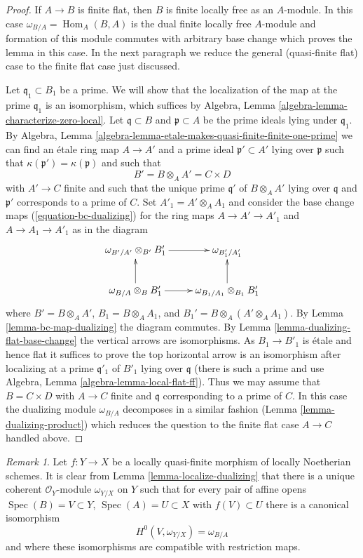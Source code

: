 \documentclass{stacks-project}
\theoremstyle{plain}
\theoremstyle{definition}
\theoremstyle{remark}
\newtheorem{remark}[subsection]{Remark}
\numberwithin{equation}{subsection}
\def\Spec{\mathop{\mathrm{Spec}}}
\def\Hom{\mathop{\mathrm{Hom}}\nolimits}
\begin{document}
\begin{proof}
If $A \to B$ is finite flat, then $B$ is finite locally free as an $A$-module.
In this case $\omega_{B/A} = \Hom_A(B, A)$ is the dual finite
locally free $A$-module and formation of this module commutes
with arbitrary base change which proves the lemma in this case.
In the next paragraph we reduce the general (quasi-finite flat)
case to the finite flat case just discussed.

\medskip\noindent
Let $\mathfrak q_1 \subset B_1$ be a prime. We will show that the
localization of the map at the prime $\mathfrak q_1$ is an isomorphism, which
suffices by Algebra, Lemma \ref{algebra-lemma-characterize-zero-local}.
Let $\mathfrak q \subset B$ and $\mathfrak p \subset A$ be the prime
ideals lying under $\mathfrak q_1$. By
Algebra, Lemma \ref{algebra-lemma-etale-makes-quasi-finite-finite-one-prime}
we can find an \'etale ring map $A \to A'$ and a prime
ideal $\mathfrak p' \subset A'$ lying over $\mathfrak p$
such that $\kappa(\mathfrak p') = \kappa(\mathfrak p)$ and
such that
$$
B' = B \otimes_A A' = C \times D
$$
with $A' \to C$ finite and such that the unique prime $\mathfrak q'$
of $B \otimes_A A'$ lying over $\mathfrak q$ and $\mathfrak p'$
corresponds to a prime of $C$. Set $A'_1 = A' \otimes_A A_1$ and
consider the base change maps
(\ref{equation-bc-dualizing}) for the ring maps
$A \to A' \to A'_1$ and $A \to A_1 \to A'_1$ as in the diagram
$$
\xymatrix{
\omega_{B'/A'} \otimes_{B'} B'_1 \ar[r] & \omega_{B'_1/A'_1} \\
\omega_{B/A} \otimes_B B'_1 \ar[r] \ar[u] &
\omega_{B_1/A_1} \otimes_{B_1} B'_1 \ar[u]
}
$$
where $B' = B \otimes_A A'$, $B_1 = B \otimes_A A_1$, and
$B_1' = B \otimes_A (A' \otimes_A A_1)$. By
Lemma \ref{lemma-bc-map-dualizing} the diagram commutes. By
Lemma \ref{lemma-dualizing-flat-base-change}
the vertical arrows are isomorphisms.
As $B_1 \to B'_1$ is \'etale and hence flat it suffices
to prove the top horizontal arrow is an isomorphism after localizing
at a prime $\mathfrak q'_1$ of $B'_1$ lying over $\mathfrak q$
(there is such a prime and use
Algebra, Lemma \ref{algebra-lemma-local-flat-ff}).
Thus we may assume that $B = C \times D$ with $A \to C$
finite and $\mathfrak q$ corresponding to a prime of $C$.
In this case the dualizing module $\omega_{B/A}$ decomposes
in a similar fashion (Lemma \ref{lemma-dualizing-product})
which reduces the question
to the finite flat case $A \to C$ handled above.
\end{proof}

\begin{remark}
\label{remark-relative-dualizing-for-quasi-finite}
Let $f : Y \to X$ be a locally quasi-finite morphism of locally Noetherian
schemes. It is clear from Lemma \ref{lemma-localize-dualizing}
that there is a unique coherent $\mathcal{O}_Y$-module
$\omega_{Y/X}$ on $Y$ such that for every pair of affine opens
$\Spec(B) = V \subset Y$, $\Spec(A) = U \subset X$ with $f(V) \subset U$
there is a canonical isomorphism
$$
H^0(V, \omega_{Y/X}) = \omega_{B/A}
$$
and where these isomorphisms are compatible with restriction maps.
\end{remark}
\end{document}
